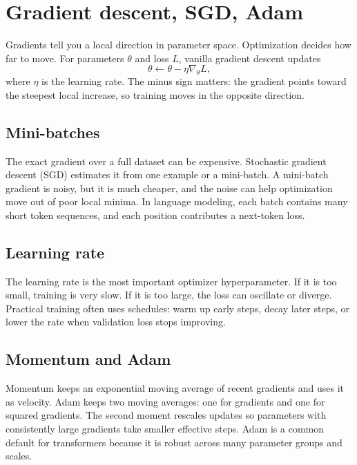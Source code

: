\section{Gradient descent, SGD, Adam}\label{sec:06}

Gradients tell you a local direction in parameter space. Optimization decides
how far to move. For parameters $\theta$ and loss $L$, vanilla gradient descent
updates
\[
  \theta \leftarrow \theta - \eta \nabla_\theta L,
\]
where $\eta$ is the learning rate. The minus sign matters: the gradient points
toward the steepest local increase, so training moves in the opposite direction.

\subsection*{Mini-batches}
The exact gradient over a full dataset can be expensive. Stochastic gradient
descent (SGD) estimates it from one example or a mini-batch. A mini-batch
gradient is noisy, but it is much cheaper, and the noise can help optimization
move out of poor local minima. In language modeling, each batch contains many
short token sequences, and each position contributes a next-token loss.

\subsection*{Learning rate}
The learning rate is the most important optimizer hyperparameter. If it is
too small, training is very slow. If it is too large, the loss can oscillate or
diverge. Practical
training often uses schedules: warm up early steps, decay later steps, or lower
the rate when validation loss stops improving.

\subsection*{Momentum and Adam}
Momentum keeps an exponential moving average of recent gradients and uses it as
velocity. Adam keeps two moving averages: one for gradients and one for squared
gradients. The second moment rescales updates so parameters with consistently
large gradients take smaller effective steps. Adam is a common default for
transformers because it is robust across many parameter groups and scales.

